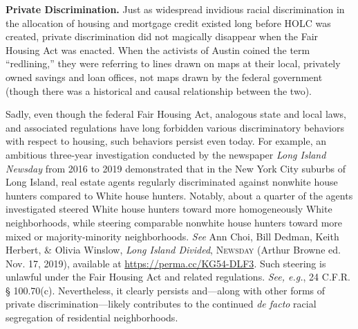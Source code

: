 \begin{questions}
\item \textbf{Private Discrimination.} Just as widespread invidious racial
discrimination in the allocation of housing and mortgage credit existed long
before HOLC was created, private discrimination did not magically disappear
when the Fair Housing Act was enacted. When the activists of Austin coined the
term ``redlining,'' they were referring to lines drawn on maps at their local,
privately owned savings and loan offices, not maps drawn by the federal
government (though there was a historical and causal relationship between the
two).

Sadly, even though the federal Fair Housing Act, analogous state and local laws,
and associated regulations have long forbidden various discriminatory behaviors
with respect to housing, such behaviors persist even today. For example, an
ambitious three-year investigation conducted by the newspaper \textit{Long
Island Newsday} from 2016 to 2019 demonstrated that in the New York City
suburbs of Long Island, real estate agents regularly discriminated against
nonwhite house hunters compared to White house hunters. Notably, about a
quarter of the agents investigated steered White house hunters toward more
homogeneously White neighborhoods, while steering comparable nonwhite house
hunters toward more mixed or majority-minority neighborhoods. \textit{See }Ann
Choi, Bill Dedman, Keith Herbert, \& Olivia Winslow, \textit{Long Island
Divided}, \textsc{Newsday} (Arthur Browne ed. Nov. 17, 2019), available at 
\url{https://perma.cc/KG54-DLF3}. Such steering is unlawful under the Fair
Housing Act and related regulations. \textit{See, e.g.}, 24 C.F.R. {\S}
100.70(c). Nevertheless, it clearly persists and---along with other forms of
private discrimination---likely contributes to the continued \textit{de facto}
racial segregation of residential neighborhoods.
\end{questions}
